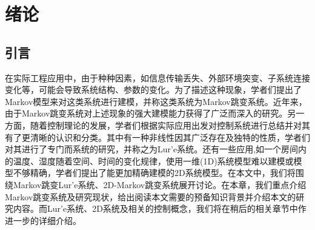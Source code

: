 
\chapter{绪论}
\section{引言}
	在实际工程应用中，由于种种因素，如信息传输丢失、外部环境突变、子系统连接变化等，可能会导致系统结构、参数的变化。为了描述这种现象，学者们提出了Markov模型来对这类系统进行建模，并称这类系统为Markov跳变系统。近年来，由于Markov跳变系统对上述现象的强大建模能力获得了广泛而深入的研究。另一方面，随着控制理论的发展，学者们根据实际应用出发对控制系统进行总结并对其有了更清晰的认识和分类。其中有一种非线性因其广泛存在及独特的性质，学者们对其进行了专门而系统的研究，并称之为Lur'e系统。还有一些应用,如一个房间内的温度、湿度随着空间、时间的变化规律，使用一维(1D)系统模型难以建模或模型不够精确，学者们提出了能更加精确建模的2D系统模型。在本文中，我们将围绕Markov跳变Lur'e系统、2D-Markov跳变系统展开讨论。在本章，我们重点介绍Markov跳变系统及研究现状，给出阅读本文需要的预备知识背景并介绍本文的研究内容。而Lur'e系统、2D系统及相关的控制概念，我们将在稍后的相关章节中作进一步的详细介绍。

